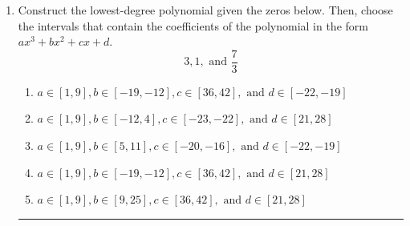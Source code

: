\documentclass[14pt]{extbook}
\newcommand{\litem}[1]{\item#1\hspace*{-1cm}\rule{\textwidth}{0.4pt}}
\begin{document}
\begin{enumerate}
\litem{
Construct the lowest-degree polynomial given the zeros below. Then, choose the intervals that contain the coefficients of the polynomial in the form $ax^3+bx^2+cx+d$.\[ 3, 1, \text{ and } \frac{7}{3} \]\begin{enumerate}[label=\Alph*.]
\item \( a \in [1, 9], b \in [-19, -12], c \in [36, 42], \text{ and } d \in [-22, -19] \)
\item \( a \in [1, 9], b \in [-12, 4], c \in [-23, -22], \text{ and } d \in [21, 28] \)
\item \( a \in [1, 9], b \in [5, 11], c \in [-20, -16], \text{ and } d \in [-22, -19] \)
\item \( a \in [1, 9], b \in [-19, -12], c \in [36, 42], \text{ and } d \in [21, 28] \)
\item \( a \in [1, 9], b \in [9, 25], c \in [36, 42], \text{ and } d \in [21, 28] \)


\end{enumerate}}
\end{enumerate}
\end{document}
